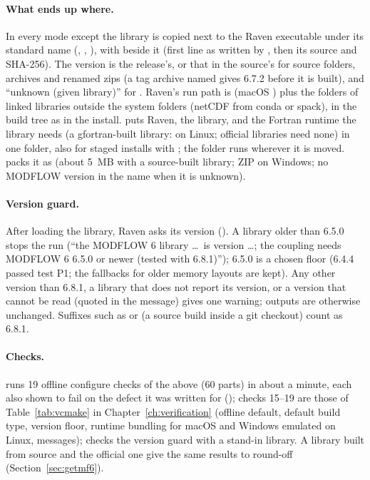 \paragraph{What ends up where.} In every mode except  the library is copied next to the Raven executable under
its standard name (, , ), with  beside it
(first line  as written by , then its source and SHA-256). The version is the
release's, or that in the source's  for source folders, archives and renamed zips (a tag archive named
 gives 6.7.2 before it is built), and ``unknown (given library)'' for . Raven's run path is
 (macOS ) plus the folders of linked libraries outside the system folders (netCDF from
conda or spack), in the build tree as in the install.  puts Raven, the library,
 and the Fortran runtime the library needs (a gfortran-built library:  on
Linux; official libraries need none) in one  folder, also for staged installs with ; the folder
runs wherever it is moved.  packs it as  (about 5~MB with a
source-built library; ZIP on Windows; no MODFLOW version in the name when it is unknown).

\paragraph{Version guard.} After loading the library, Raven asks its version (). A library older
than 6.5.0 stops the run (``the MODFLOW 6 library \ldots\ is version \ldots; the coupling needs MODFLOW 6 6.5.0 or newer
(tested with 6.8.1)''); 6.5.0 is a chosen floor (6.4.4 passed test P1; the fallbacks for older memory layouts are
kept). Any other version than 6.8.1, a library that does not report its version, or a version that cannot be read
(quoted in the message) gives one warning; outputs are otherwise unchanged. Suffixes such as  or
 (a source build inside a git checkout) count as 6.8.1.

\paragraph{Checks.}  runs 19 offline configure checks of the above (60 parts) in about a
minute, each also shown to fail on the defect it was written for (); checks 15--19 are those of
Table~\ref{tab:vcmake} in Chapter~\ref{ch:verification} (offline default, default build type, version floor, runtime
bundling for macOS and Windows emulated on Linux, messages);  checks the
version guard with a stand-in library. A library built from source and the official one give the same results to
round-off (Section~\ref{sec:getmf6}).

